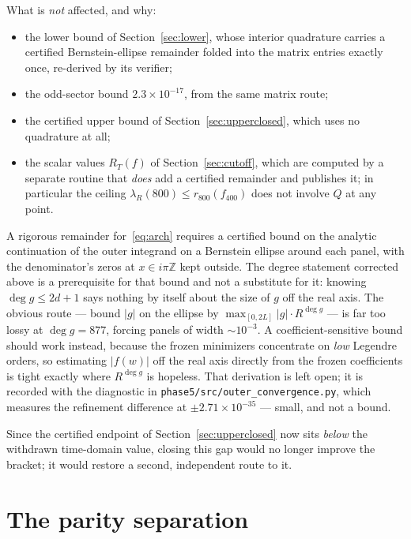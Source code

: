 \documentclass[11pt,a4paper]{article}
\theoremstyle{definition}
\theoremstyle{remark}
\newcommand{\lR}{\lambda_{R}}
\newcommand{\src}[1]{{\footnotesize\texttt{#1}}}
\begin{document}
What is \emph{not} affected, and why:
\begin{itemize}
\item the lower bound of Section~\ref{sec:lower}, whose interior quadrature
  carries a certified Bernstein-ellipse remainder folded into the matrix entries
  exactly once, re-derived by its verifier;
\item the odd-sector bound $2.3\times10^{-17}$, from the same matrix route;
\item the certified upper bound of Section~\ref{sec:upperclosed}, which uses no
  quadrature at all;
\item the scalar values $R_T(f)$ of Section~\ref{sec:cutoff}, which are computed
  by a separate routine that \emph{does} add a certified remainder and publishes
  it; in particular the ceiling $\lR(800) \le r_{800}(f_{400})$ does not involve
  $Q$ at any point.
\end{itemize}

A rigorous remainder for~\eqref{eq:arch} requires a certified bound on the
analytic continuation of the outer integrand on a Bernstein ellipse around each
panel, with the denominator's zeros at $x \in i\pi\mathbb{Z}$ kept outside. The
degree statement corrected above is a prerequisite for that bound and not a
substitute for it: knowing $\deg g \le 2d+1$ says nothing by itself about the
size of $g$ off the real axis. The obvious route --- bound $|g|$ on the ellipse
by $\max_{[0,2L]}|g| \cdot R^{\deg g}$ --- is far too lossy at $\deg g = 877$,
forcing panels of width $\sim10^{-3}$. A coefficient-sensitive bound should
work instead, because the frozen minimizers concentrate on \emph{low} Legendre
orders, so estimating $|f(w)|$ off the real axis directly from the frozen
coefficients is tight exactly where $R^{\deg g}$ is hopeless. That derivation is
left open; it is recorded with the diagnostic in
\src{phase5/src/outer\_convergence.py}, which measures the refinement difference
at $\pm 2.71\times10^{-35}$ --- small, and not a bound.

Since the certified endpoint of Section~\ref{sec:upperclosed} now sits
\emph{below} the withdrawn time-domain value, closing this gap would no longer
improve the bracket; it would restore a second, independent route to it.

\section{The parity separation}
\label{sec:parity}
\end{document}
